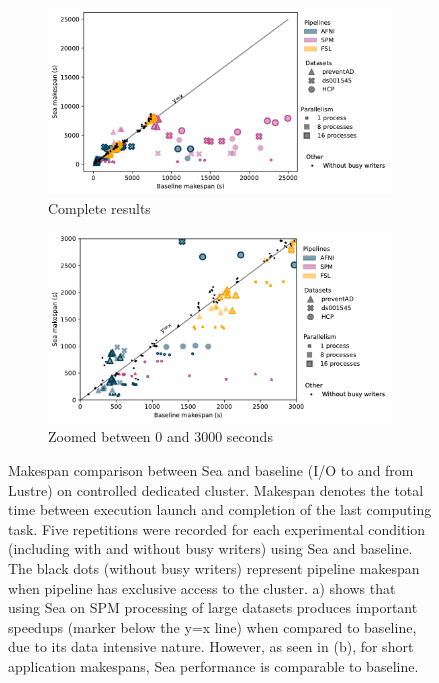 \documentclass[pdflatex,sn-mathphys-num]{sn-jnl}
\theoremstyle{thmstyleone}%
\theoremstyle{thmstyletwo}%
\theoremstyle{thmstylethree}%
\begin{document}
\begin{figure}
\centering

\begin{subfigure}{\textwidth}
    \centering
    \captionsetup{width=\textwidth}
    \includegraphics[width=\textwidth]{figures/slashbin_nozoom_updated.pdf}%
    \caption{Complete results}\label{fig:seaneuro:slashbinfull}
\end{subfigure}
\begin{subfigure}{\textwidth}
    \centering
    \captionsetup{width=\textwidth}
    \includegraphics[width=\textwidth]{figures/slashbin_withzoom_updated.pdf}
    \caption{Zoomed between 0 and 3000 seconds}\label{fig:seaneuro:slashbinzoom}
\end{subfigure}
\caption{Makespan comparison between Sea and baseline (I/O to and from Lustre) on controlled dedicated cluster. Makespan
denotes the total time between execution launch and completion of the last computing task. Five repetitions were recorded for each experimental condition (including with and without busy writers)
using Sea and baseline. The black dots (without busy writers) represent pipeline makespan when pipeline has exclusive access to the cluster.
a) shows that using Sea on SPM processing of large 
datasets produces important speedups (marker below the y=x line) when compared to baseline, due to its data intensive nature.
However, as seen in (b), for short application makespans, Sea performance is comparable to baseline. }
\label{fig:seaneuro:slashbin}
\end{figure}
\end{document}

